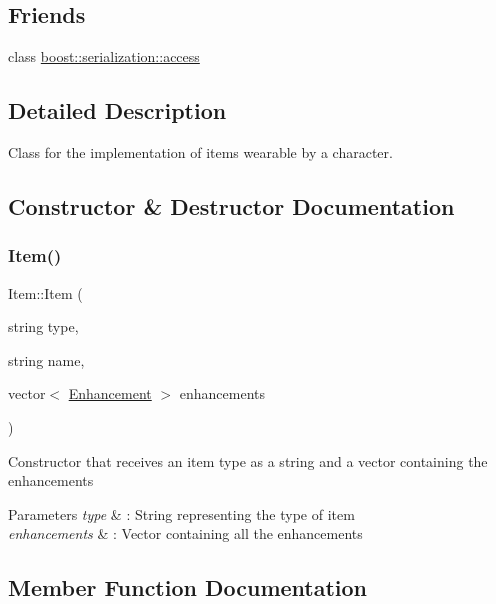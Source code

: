 \subsection*{Friends}
\begin{DoxyCompactItemize}
\item 
class \hyperlink{class_item_ac98d07dd8f7b70e16ccb9a01abf56b9c}{boost\+::serialization\+::access}
\end{DoxyCompactItemize}


\subsection{Detailed Description}
Class for the implementation of items wearable by a character. 

\subsection{Constructor \& Destructor Documentation}
\hypertarget{class_item_aa758d9160941f18ca7be38bc3835d5b9}{}\label{class_item_aa758d9160941f18ca7be38bc3835d5b9} 
\subsubsection{\texorpdfstring{Item()}{Item()}}
{\footnotesize\ttfamily Item\+::\+Item (\begin{DoxyParamCaption}\item[{string}]{type,  }\item[{string}]{name,  }\item[{vector$<$ \hyperlink{class_enhancement}{Enhancement} $>$}]{enhancements }\end{DoxyParamCaption})}

Constructor that receives an item type as a string and a vector containing the enhancements 
\begin{DoxyParams}{Parameters}
{\em type} & \+: String representing the type of item \\
\hline
{\em enhancements} & \+: Vector containing all the enhancements \\
\hline
\end{DoxyParams}


\subsection{Member Function Documentation}
\hypertarget{class_item_a5827bb049b61a0a95e448607d1247914}{}\label{class_item_a5827bb049b61a0a95e448607d1247914} 
